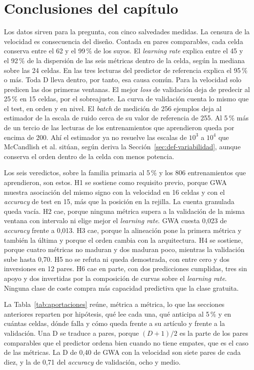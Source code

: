 \section{Conclusiones del capítulo}
\label{sec:res-conclusiones}

Los datos sirven para la pregunta, con cinco salvedades medidas. La censura de la velocidad es consecuencia del diseño. Contada en pares comparables, cada celda conserva entre el 62 y el 99\,\% de los suyos. El \emph{learning rate} explica entre el 45 y el 92\,\% de la dispersión de las seis métricas dentro de la celda, según la mediana sobre las 24 celdas. En las tres lecturas del predictor de referencia explica el 95\,\% o más. Toda D lleva dentro, por tanto, esa causa común. Para la velocidad solo predicen las dos primeras ventanas. El mejor \emph{loss} de validación deja de predecir al 25\,\% en 15 celdas, por el sobreajuste. La curva de validación cuenta lo mismo que el test, en orden y en nivel. El \emph{batch} de medición de 256 ejemplos deja al estimador de la escala de ruido cerca de su valor de referencia de 255. Al 5\,\% más de un tercio de las lecturas de los entrenamientos que aprendieron queda por encima de 200. Ahí el estimador ya no resuelve las escalas de $10^{3}$ a $10^{4}$ que McCandlish et al. sitúan, según deriva la Sección~\ref{sec:def-variabilidad}, aunque conserva el orden dentro de la celda con menos potencia.

Los seis veredictos, sobre la familia primaria al 5\,\% y los 806 entrenamientos que aprendieron, son estos. H1 se sostiene como requisito previo, porque GWA muestra asociación del mismo signo con la velocidad en 16 celdas y con el \emph{accuracy} de test en 15, más que la posición en la rejilla. La cuenta granulada queda vacía. H2 cae, porque ninguna métrica supera a la validación de la misma ventana con intervalo ni elige mejor el \emph{learning rate}. GWA cuesta 0,023 de \emph{accuracy} frente a 0,013. H3 cae, porque la alineación pone la primera métrica y también la última y porque el orden cambia con la arquitectura. H4 se sostiene, porque cuatro métricas no maduran y dos maduran poco, mientras la validación sube hasta 0,70. H5 no se refuta ni queda demostrada, con entre cero y dos inversiones en 12 pares. H6 cae en parte, con dos predicciones cumplidas, tres sin apoyo y dos invertidas por la composición de curvas sobre el \emph{learning rate}. Ninguna clase de coste compra más capacidad predictiva que la clase gratuita.

La Tabla~\ref{tab:aportaciones} reúne, métrica a métrica, lo que las secciones anteriores reparten por hipótesis, qué lee cada una, qué anticipa al 5\,\% y en cuántas celdas, dónde falla y cómo queda frente a su artículo y frente a la validación. Una D se traduce a pares, porque $(D + 1)/2$ es la parte de los pares comparables que el predictor ordena bien cuando no tiene empates, que es el caso de las métricas. La D de 0,40 de GWA con la velocidad son siete pares de cada diez, y la de 0,71 del \emph{accuracy} de validación, ocho y medio.

